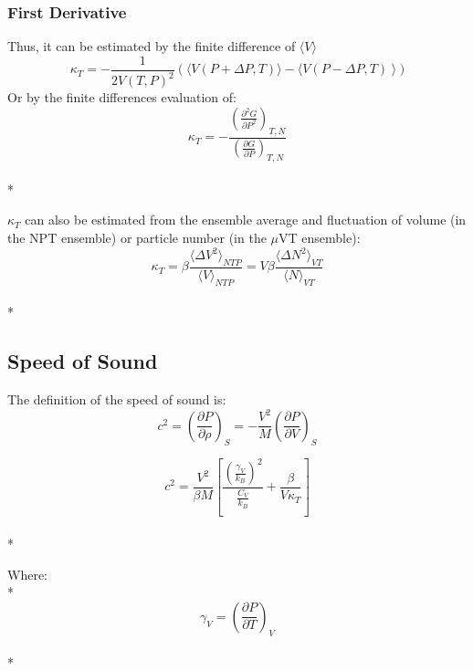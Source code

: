 \documentclass[aps,pre,twocolumn,nofootinbib,superscriptaddress,linenumbers,10pt, draft,tightenlines]{revtex4-1}
\begin{document}
\subsubsection{First Derivative}
Thus, it can be estimated by the finite difference of $\langle V \rangle$
\begin{equation}\kappa_T = -\frac{1}{2V(T,P)^2} \left(\langle V(P+\Delta P,T)\rangle - \langle V(P-\Delta P,T)\right\rangle) \end{equation}
Or by the finite differences evaluation of:
\begin{equation}\kappa_T = -\frac{\left(\frac{\partial^2 G}{\partial P^2}\right)_{T, N}}{\left(\frac{\partial G}{\partial P}\right)_{T, N}}\end{equation}\\*

$\kappa_T$ can also be estimated from the ensemble average and fluctuation of volume (in the NPT ensemble) or particle number (in the $\mu$VT ensemble)\cite{comp}:
\begin{equation}\kappa_T = \beta \frac{\langle \Delta V^2 \rangle_{NTP}}{\langle V \rangle_{NTP}} = V \beta \frac{\langle \Delta N^2 \rangle_{VT}}{\langle N \rangle_{VT}}\end{equation}\\*

\subsection{Speed of Sound}
The definition of the speed of sound is\cite{sos}:
\begin{equation}c^2 = \left(\frac{\partial P}{\partial \rho}\right)_{S} = -\frac{V^2}{M}\left(\frac{\partial P}{\partial V}\right)_{S}\end{equation}


\begin{equation}c^2 = \frac{V^2}{\beta M}\left[\frac{\left(\frac{\gamma_V}{k_B}\right)^2}{\frac{C_V}{k_B}} + \frac{\beta}{V \kappa_T}\right]\end{equation}\\*

Where:\\*
\begin{equation}\gamma_V = \left(\frac{\partial P}{\partial T}\right)_{V}\end{equation}\\*
\end{document}
